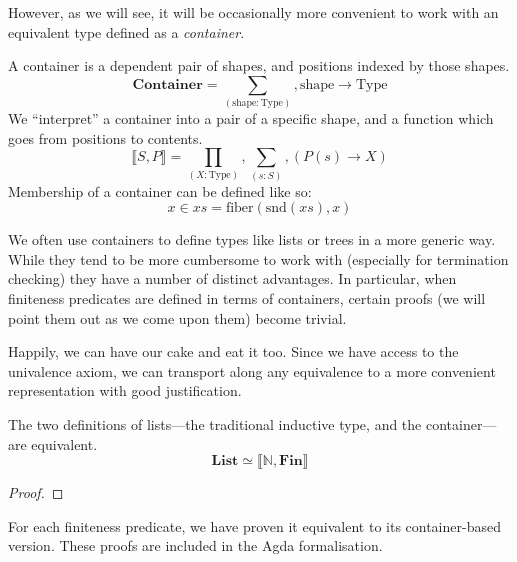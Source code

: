 However, as we will see, it will be occasionally more convenient to work with an
equivalent type defined as a \emph{container}.
\begin{rm-definition}[Container] \label{container-def}
  A container \cite{abbottContainersConstructingStrictly2005} is a dependent
  pair of shapes, and positions indexed by those shapes. 
  \begin{equation}
    \mathbf{Container} = \sum_{(\text{shape} : \text{Type})} , \text{shape} \rightarrow \text{Type}
  \end{equation}
  We ``interpret'' a container into a pair of a specific shape, and a function
  which goes from positions to contents.
  \begin{equation}
    \llbracket S , P \rrbracket = \prod_{(X : \text{Type})} , \sum_{(s : S)} , \left( P(s) \rightarrow X \right)
  \end{equation}
  Membership of a container can be defined like so:
  \begin{equation}
    x \in \mathit{xs} = \text{fiber}(\text{snd}(\mathit{xs}), x)
  \end{equation}
\end{rm-definition}

We often use containers to define types like lists or trees in a more generic
way.
While they tend to be more cumbersome to work with (especially for termination
checking) they have a number of distinct advantages.
In particular, when finiteness predicates are defined in terms of containers,
certain proofs (we will point them out as we come upon them) become trivial.

Happily, we can have our cake and eat it too.
Since we have access to the univalence axiom, we can transport along any
equivalence to a more convenient representation with good justification.

\begin{rm-lemma}
  The two definitions of lists---the traditional inductive type, and the
  container---are equivalent.
  \begin{equation}
    \mathbf{List} \simeq \llbracket \mathbb{N} , \mathbf{Fin} \rrbracket
  \end{equation}
\end{rm-lemma}
\begin{proof}
\end{proof}

For each finiteness predicate, we have proven it equivalent to its
container-based version.
These proofs are included in the Agda formalisation.
